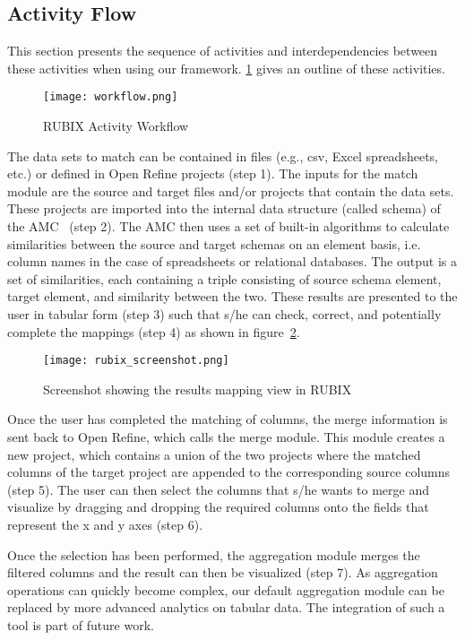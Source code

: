 \subsection{Activity Flow}
This section presents the sequence of activities and interdependencies between these activities when using our framework. \ref{fig:Activity_workflow} gives an outline of these activities.

\begin{figure}[ht!]
  \centering
    \texttt{[image: workflow.png]}
  \caption{RUBIX Activity Workflow}
  \label{fig:Activity_workflow}
\end{figure}

The data sets to match can be contained in files (e.g., csv, Excel spreadsheets, etc.) or defined in Open Refine projects (step 1). The inputs for the match module are the source and target files and/or projects that contain the data sets. These projects are imported into the internal data structure (called schema) of the AMC~\cite{Peukert:ICDE:11} (step 2). The AMC then uses a set of built-in algorithms to calculate similarities between the source and target schemas on an element basis, i.e. column names in the case of spreadsheets or relational databases. The output is a set of similarities, each containing a triple consisting of source schema element, target element, and similarity between the two. These results are presented to the user in tabular form (step 3) such that s/he can check, correct, and potentially complete the mappings (step 4) as shown in figure~\ref{fig:rubix_screenshot}.

\begin{figure}[ht!]
  \centering
    \texttt{[image: rubix\_screenshot.png]}
  \caption{Screenshot showing the results mapping view in RUBIX}
  \label{fig:rubix_screenshot}
\end{figure}

Once the user has completed the matching of columns, the merge information is sent back to Open Refine, which calls the merge module. This module creates a new project, which contains a union of the two projects where the matched columns of the target project are appended to the corresponding source columns (step 5). The user can then select the columns that s/he wants to merge and visualize by dragging and dropping the required columns onto the fields that represent the x and y axes (step 6).

Once the selection has been performed, the aggregation module merges the filtered columns and the result can then be visualized (step 7). As aggregation operations can quickly become complex, our default aggregation module can be replaced by more advanced analytics on tabular data. The integration of such a tool is part of future work.


